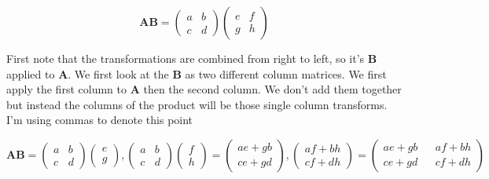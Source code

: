 \begin{equation*}
	\mathbf{AB} = \begin{pmatrix}
		a & b \\ 
		c & d 
	\end{pmatrix}\begin{pmatrix}
		e & f \\ 
		g & h 
	\end{pmatrix}
\end{equation*}

First note that the transformations are combined from right to left, so it's $\mathbf{B}$ applied to \textbf{A}. We first look at the \textbf{B} as two different column matrices. We first apply the first column to \textbf{A} then the second column. We don't add them together but instead the columns of the product will be those single column transforms. I'm using commas to denote this point

\begin{equation*}
	\mathbf{AB} = \begin{pmatrix}
		a & b \\ 
		c & d 
	\end{pmatrix}\begin{pmatrix}
		e  \\ 
		g 
	\end{pmatrix} , 
	\begin{pmatrix}
		a & b \\ 
		c & d 
	\end{pmatrix}\begin{pmatrix}
		f \\ 
		h 
	\end{pmatrix} = \begin{pmatrix}
		ae + gb \\ 
		ce + gd  
	\end{pmatrix}, 
	\begin{pmatrix}
		af + bh \\ 
		cf + dh
 	\end{pmatrix} = 
 	\begin{pmatrix}
 		ae + gb && af + bh \\ 
 		ce + gd && cf + dh 
 	\end{pmatrix}
\end{equation*}


